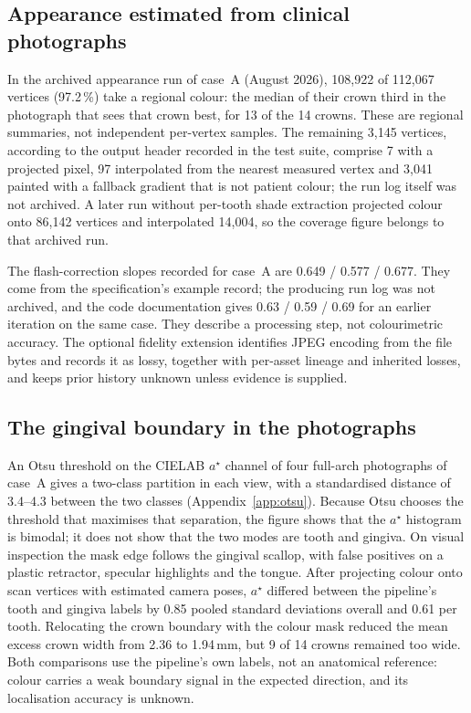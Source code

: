 \documentclass[11pt,a4paper]{article}
\begin{document}
\subsection{Appearance estimated from clinical photographs}

In the archived appearance run of case~A (August 2026), 108{,}922 of 112{,}067 vertices
(97.2\,\%) take a regional colour: the median of their crown third in the photograph that
sees that crown best, for 13 of the 14 crowns. These are regional summaries, not
independent per-vertex samples. The remaining 3{,}145 vertices, according to the output
header recorded in the test suite, comprise 7 with a projected pixel, 97 interpolated from
the nearest measured vertex and 3{,}041 painted with a fallback gradient that is not patient
colour; the run log itself was not archived. A later run without per-tooth shade extraction
projected colour onto 86{,}142 vertices and interpolated 14{,}004, so the coverage figure
belongs to that archived run.

The flash-correction slopes recorded for case~A are 0.649 / 0.577 / 0.677. They come from the
specification's example record; the producing run log was not archived, and the code
documentation gives 0.63 / 0.59 / 0.69 for an earlier iteration on the same case. They
describe a processing step, not colourimetric accuracy. The optional fidelity extension
identifies JPEG encoding from the file bytes and records it as lossy, together with per-asset
lineage and inherited losses, and keeps prior history unknown unless evidence is supplied.

\subsection{The gingival boundary in the photographs}

An Otsu threshold on the CIELAB $a^\star$ channel of four full-arch photographs of case~A
gives a two-class partition in each view, with a standardised distance of 3.4--4.3 between
the two classes (Appendix~\ref{app:otsu}). Because Otsu chooses the threshold that maximises
that separation, the figure shows that the $a^\star$ histogram is bimodal; it does not show
that the two modes are tooth and gingiva. On visual inspection the mask edge follows the
gingival scallop, with false positives on a plastic retractor, specular highlights and the
tongue. After projecting colour onto scan vertices with estimated camera poses, $a^\star$
differed between the pipeline's tooth and gingiva labels by 0.85 pooled standard deviations
overall and 0.61 per tooth. Relocating the crown boundary with the colour mask reduced the
mean excess crown width from 2.36 to 1.94\,mm, but 9 of 14 crowns remained too wide. Both
comparisons use the pipeline's own labels, not an anatomical reference: colour carries a
weak boundary signal in the expected direction, and its localisation accuracy is unknown.
\end{document}
